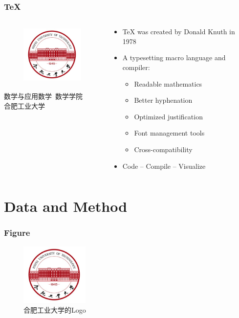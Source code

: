 \documentclass{beamer}
\begin{document}
\begin{frame}
\frametitle{\TeX{}}
\begin{columns}
\begin{column}{4cm}
	\begin{figure}
		\includegraphics[height=3cm]{logo-background.jpg}
	\end{figure}
	\begin{center}
		\tiny
		数学与应用数学\
		数学学院\\
		合肥工业大学 \\
	\end{center}
\end{column}
\begin{column}{6cm}
	\begin{itemize}
		\item \TeX{} was created by Donald Knuth in 1978
		\item A typesetting macro language and compiler:
		\begin{itemize}
			\item Readable mathematics
			\item Better hyphenation
			\item Optimized justification
			\item Font management tools
			\item Cross-compatibility
		\end{itemize}
		\item Code -- Compile -- Visualize
	\end{itemize}
\end{column}
\end{columns}
\end{frame}



\section{Data and Method}

\begin{frame}
\frametitle{Figure}
\vspace{-0.3cm}
\begin{figure}[h]
\centering
\includegraphics[width=0.3\textwidth]{logo-background.jpg}
\caption{合肥工业大学的Logo}
\end{figure}
\end{frame}
\end{document}
